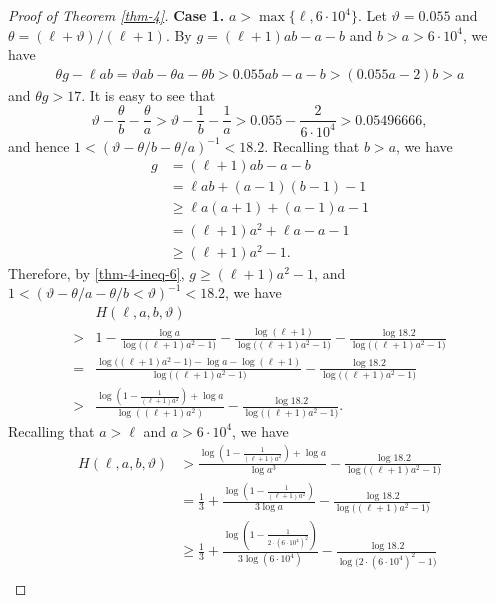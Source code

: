 \documentclass[12pt,a4paper,reqno]{amsart}
\numberwithin{equation}{section}
\theoremstyle{plain}
\theoremstyle{definition}
\begin{document}
\begin{proof}[Proof of Theorem \ref{thm-4}]
\textbf{Case 1.} $a>\max\{\ell,6\cdot 10^{4}\}$.
Let $\vartheta=0.055$ and $\theta=(\ell+\vartheta)/(\ell+1)$. By $g=(\ell+1)ab-a-b$ and $b>a>6\cdot 10^{4}$, we have 
\begin{align*}
	\theta g-\ell ab 
	=\vartheta ab-\theta a-\theta b
	>0.055ab-a-b 
	>(0.055a-2)b
	>a
\end{align*}
 and $\theta g>17$. It is easy to see that 
 \begin{equation*}
	\vartheta -\frac{\theta}{b}-\frac{\theta}{a}>\vartheta-\frac{1}{b}-\frac{1}{a}>0.055-\frac{2}{6\cdot 10^{4}}>0.05496666,
\end{equation*}
and hence $1<(\vartheta-\theta/b-\theta/a)^{-1}<18.2$.
Recalling that $b>a$, we have
\begin{align*}
	g&=(\ell+1)ab-a-b\\
	&=\ell ab+(a-1)(b-1)-1\\
	&\geq \ell a(a+1)+(a-1)a-1\\
	&=(\ell+1)a^{2}+\ell a-a-1\\
	&\geq (\ell+1)a^{2}-1.
\end{align*}
Therefore, by \eqref{thm-4-ineq-6}, $g\geq (\ell+1)a^{2}-1$, and  $1<(\vartheta-\theta/a-\theta/b<\vartheta)^{-1}<18.2$, we have
\begin{align*}
	&H(\ell,a,b,\vartheta)\\
	>& 1-\frac{\log a}{\log  \big( (\ell+1)a^{2}-1 \big)}-\frac{\log(\ell+1)}{\log  \big( (\ell+1)a^{2}-1 \big)}-\frac{\log 18.2}{\log \big( (\ell+1)a^{2}-1 \big)}\\
	=&\frac{\log  \big( (\ell+1)a^{2}-1 \big)-\log a-\log(\ell+1)}
	{\log  \big( (\ell+1)a^{2}-1 \big)}
	-\frac{\log 18.2}{\log \big( (\ell+1)a^{2}-1 \big)}\\
	>& \frac{\log\left(1-\frac{1}{(\ell+1)a^{2}}\right)+\log a}{\log\left({(\ell+1)a^{2}}\right)}-\frac{\log 18.2}{\log \big( (\ell+1)a^{2}-1 \big)}.
\end{align*}
Recalling that  $a>\ell$ and $a>6\cdot 10^{4}$, we have
\begin{align*}
	H(\ell,a,b,\vartheta)
	&> \frac{\log\left(1-\frac{1}{(\ell+1)a^{2}}\right)+\log a}{\log a^{3}}-\frac{\log18.2}{\log \big( (\ell+1)a^{2}-1 \big)}\\
	&=\frac{1}{3}+\frac{\log(1-\frac{1}{(\ell+1)a^{2}})}{3\log a}-\frac{\log 18.2}{\log \big( (\ell+1)a^{2}-1 \big)}\\
	&\geq \frac{1}{3}+ \frac{\log(1-\frac{1}{2\cdot (6\cdot 10^{4})^{2}})}{3\log (6\cdot 10^{4})}-\frac{\log 18.2}{\log \big(2\cdot (6\cdot 10^{4})^{2}-1\big)}\\

\end{align*}
\end{proof}
\end{document}
